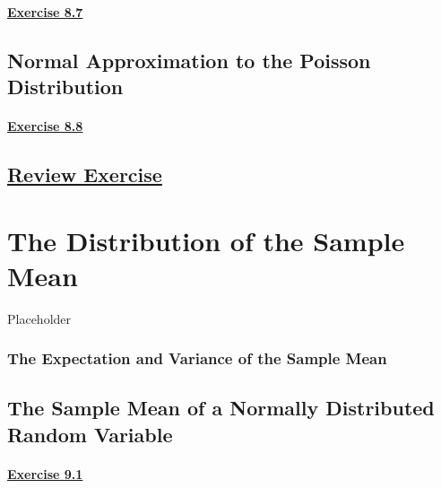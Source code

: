 \documentclass[
  11pt,
]{book}
\begin{document}
\subsubsection*{\texorpdfstring{\hyperref[ex87a]{Exercise 8.7}}{Exercise 8.7}}\label{exercise-8.7}

\section{Normal Approximation to the Poisson Distribution}\label{normal-approximation-to-the-poisson-distribution}

\subsubsection*{\texorpdfstring{\hyperref[ex88a]{Exercise 8.8}}{Exercise 8.8}}\label{exercise-8.8}

\section*{\texorpdfstring{\hyperref[re8a]{Review Exercise}}{Review Exercise}}\label{review-exercise-7}

\chapter{The Distribution of the Sample Mean}\label{the-distribution-of-the-sample-mean}

Placeholder

\subsection*{The Expectation and Variance of the Sample Mean}\label{the-expectation-and-variance-of-the-sample-mean}

\section{The Sample Mean of a Normally Distributed Random Variable}\label{the-sample-mean-of-a-normally-distributed-random-variable}

\subsubsection*{\texorpdfstring{\hyperref[ex91a]{Exercise 9.1}}{Exercise 9.1}}\label{exercise-9.1}
\end{document}
